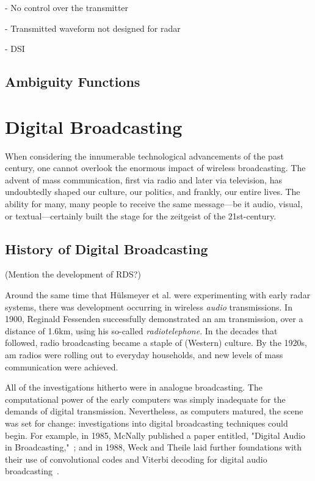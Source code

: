 \documentclass[class=report,11pt,crop=false]{standalone}
\begin{document}
- No control over the transmitter

- Transmitted waveform not designed for radar

- DSI

\subsection{Ambiguity Functions}

\section{Digital Broadcasting}
When considering the innumerable technological advancements of the past century, one cannot overlook the enormous impact of wireless broadcasting. The advent of mass communication, first via radio and later via television, has undoubtedly shaped our culture, our politics, and frankly, our entire lives. The ability for many, many people to receive the same message---be it audio, visual, or textual---certainly built the stage for the zeitgeist of the 21st-century.

\subsection{History of Digital Broadcasting}
(Mention the development of RDS?) %

Around the same time that H\"ulsmeyer et al. were experimenting with early radar systems, there was development occurring in wireless \emph{audio} transmissions. In 1900, Reginald Fessenden successfully demonstrated an \gls{am} transmission, over a distance of 1.6km, using his so-called \emph{radiotelephone}. In the decades that followed, radio broadcasting became a staple of (Western) culture. By the 1920s, \gls{am} radios were rolling out to everyday households, and new levels of mass communication were achieved.

All of the investigations hitherto were in analogue broadcasting. The computational power of the early computers was simply inadequate for the demands of digital transmission. Nevertheless, as computers matured, the scene was set for change: investigations into digital broadcasting techniques could begin. For example, in 1985, McNally published a paper entitled, "Digital Audio in Broadcasting,"~\cite{McNally1985}; and in 1988, Weck and Theile laid further foundations with their use of convolutional codes and Viterbi decoding for digital audio broadcasting~\cite{weck1988dab}.
\end{document}
